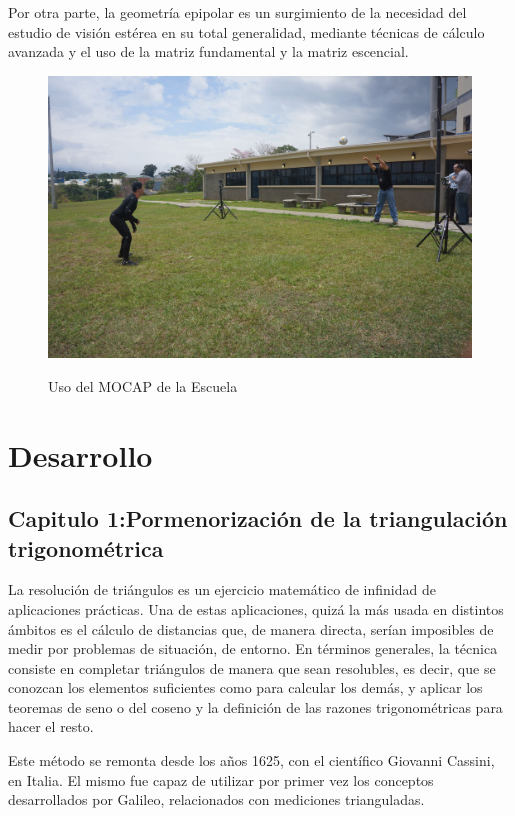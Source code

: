 \documentclass[11pt,letterpaper]{article}     %
\begin{document}
Por otra parte, la geometr\' ia epipolar es un surgimiento de la necesidad del estudio de visi\' on est\' erea en su total generalidad, mediante t\' ecnicas de c\' alculo avanzada y el uso de la matriz fundamental y la matriz escencial.

\begin{figure}[hbtp]
\caption{Uso del MOCAP de la Escuela}
\centering
\includegraphics[scale=0.25]{imagenes/1614262_755232877844886_6375624551639752710_o.jpg}
\label{fig:usoMOCAP}
\end{figure}



\section{Desarrollo}
\subsection{Capitulo 1:Pormenorizaci\' on de la triangulaci\' on trigonom\' etrica}
La resolución de triángulos es un ejercicio matemático de infinidad de aplicaciones prácticas. Una de estas aplicaciones, quizá la más usada en distintos ámbitos es el cálculo de distancias que, de manera directa, serían imposibles de medir por problemas de situación, de entorno. 
En t\' erminos generales, la t\' ecnica consiste en completar triángulos de manera que sean resolubles, es decir, que se conozcan los elementos suficientes como para calcular los demás, y aplicar los teoremas de seno o del coseno y la definición de las razones trigonométricas para hacer el resto. 

Este m\' etodo se remonta desde los a\~ nos 1625, con el cient\' ifico Giovanni Cassini, en Italia. El mismo fue capaz de utilizar por primer vez los conceptos desarrollados por Galileo, relacionados con mediciones trianguladas.
\end{document}
